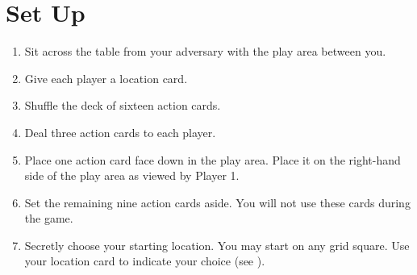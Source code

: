 \section*{Set Up}
\begin{enumerate}[leftmargin=*]
	\item Sit across the table from your adversary with the play area between you.
	\item Give each player a location card. 
	\item Shuffle the deck of sixteen action cards.
	\item Deal three action cards to each player.
	\item Place one action card face down in the play area. Place it on the right-hand side of the play area as viewed by Player 1.
	\item Set the remaining nine action cards aside. You will not use these cards during the game.
	\item Secretly choose your starting location. You may start on any grid square. Use your location card to indicate your choice (see {}).
\end{enumerate}

